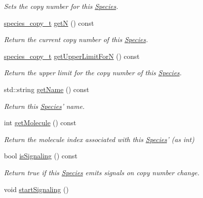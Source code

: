 \begin{DoxyCompactItemize}
\begin{DoxyCompactList}\small\item\em Sets the copy number for this \hyperlink{classchem_1_1Species}{Species}. \end{DoxyCompactList}\item 
\hyperlink{common_8h_a3503f321fd36304ee274141275cca586}{species\-\_\-copy\-\_\-t} \hyperlink{classchem_1_1Species_af7c9f51060b84169b428a7796dad6dca}{get\-N} () const 
\begin{DoxyCompactList}\small\item\em Return the current copy number of this \hyperlink{classchem_1_1Species}{Species}. \end{DoxyCompactList}\item 
\hyperlink{common_8h_a3503f321fd36304ee274141275cca586}{species\-\_\-copy\-\_\-t} \hyperlink{classchem_1_1Species_a05fbe0a05f028beb1bb729f19d44a56a}{get\-Upper\-Limit\-For\-N} () const 
\begin{DoxyCompactList}\small\item\em Return the upper limit for the copy number of this \hyperlink{classchem_1_1Species}{Species}. \end{DoxyCompactList}\item 
std\-::string \hyperlink{classchem_1_1Species_aa32c8f7fb344c68539a927c6a7f916c7}{get\-Name} () const 
\begin{DoxyCompactList}\small\item\em Return this \hyperlink{classchem_1_1Species}{Species}' name. \end{DoxyCompactList}\item 
int \hyperlink{classchem_1_1Species_a330ef4514a8979a6ea0e6f71ed5cb820}{get\-Molecule} () const 
\begin{DoxyCompactList}\small\item\em Return the molecule index associated with this \hyperlink{classchem_1_1Species}{Species}' (as int) \end{DoxyCompactList}\item 
bool \hyperlink{classchem_1_1Species_aa412f592e88600b48e3df591fc4cd655}{is\-Signaling} () const 
\begin{DoxyCompactList}\small\item\em Return true if this \hyperlink{classchem_1_1Species}{Species} emits signals on copy number change. \end{DoxyCompactList}\item 
void \hyperlink{classchem_1_1Species_a2d3d9f6e7c7d9c7bdd87ff5373a7d08c}{start\-Signaling} ()

\end{DoxyCompactItemize}
